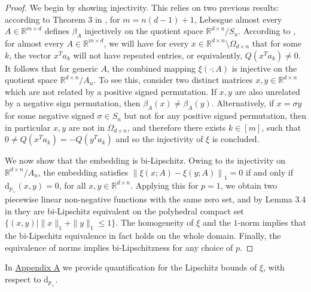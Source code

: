 \documentclass{amsart}
\theoremstyle{plain}
\theoremstyle{definition}
\theoremstyle{remark}
\newcommand{\RR}{\mathbb{R}}
\newcommand{\normp}[2]{\left\|#1\right\|_{#2}}
\newcommand{\dap}[1]{\mathrm{d}_{#1_+}}
\begin{document}
\begin{proof}
We begin by showing injectivity. This relies on two previous results: according to Theorem 3 in \cite{dym2025quantitativeboundssortingbasedpermutationinvariant}, for $m = n(d-1) + 1$, Lebesgue almost every $A \in \RR^{m \times d}$ defines $\beta_A$ injectively on the quotient space $\RR^{d \times n} / S_n$. According to \cite{frames}, for almost every $A  \in \RR^{m \times d}$, we will have for every $x \in \RR^{d\times n} \setminus \Omega_{d \times n}$ that for some $k$, the vector $x^Ta_k $ will not have repeated entries, or equivalently, $Q(x^Ta_k)\neq 0 $. It follows that for generic $A$, the combined mapping $\xi(\cdot;A)$ is injective
 on the quotient space $\RR^{d \times n} / A_n$. To see this, consider two distinct matrices $x, y \in \RR^{d \times n}$ which are not related by a positive signed permutation. If $x, y$ are also unrelated by a negative sign permutation, then $\beta_A(x) \ne \beta_A(y)$. Alternatively, if $x = \sigma y$ for some negative signed $\sigma \in S_n$ but not for any positive signed permutation, then in particular $x, y$ are not in $\Omega_{d \times n}$, and therefore there exists $k \in [m]$, such that $0 \neq Q\left(x^T a_k \right) = -Q\left(y^T a_k \right)$ and so the injectivity of $\xi$ is concluded. 
 
 We now show that the embedding is bi-Lipschitz. Owing to its injectivity on $\RR^{d \times n} / A_n$, the embedding satisfies $\normp{\xi(x ; A) - \xi(y ; A)}{1} = 0$ if and only if $\dap{p}(x, y) = 0$, for all $x, y \in \RR^{d \times n}$. Applying this for $p=1$, we obtain two piecewise linear non-negative functions with the same zero set, and by  Lemma 3.4 in \cite{fswgnn} they are bi-Lipschitz equivalent on the polyhedral compact set $\{(x, y) \mid  \|x\|_1+\|y\|_1\leq 1\}$. The homogeneity of $\xi$ and the  $1$-norm implies that the bi-Lipschitz equivalence in fact holds on the whole domain. Finally, the equivalence of norms implies bi-Lipschitzness for any choice of  $p$.
\end{proof}
In \href{sec:appendixA}{Appendix A} we provide quantification for the Lipschitz bounds of $\xi$, with respect to $\dap{p}$. 
\end{document}

